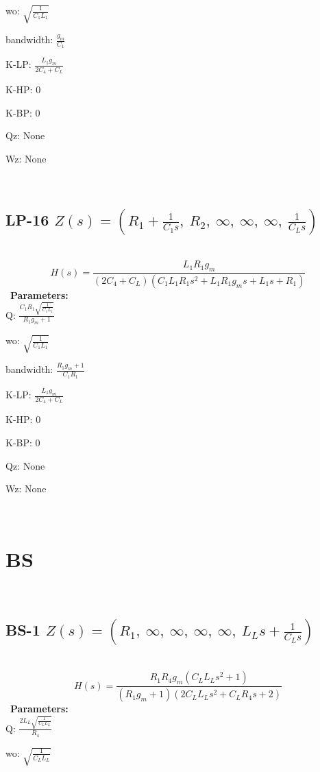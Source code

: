 \documentclass{article}
\begin{document}
wo: $\sqrt{\frac{1}{C_{1} L_{1}}}$\ 

bandwidth: $\frac{g_{m}}{C_{1}}$\ 

K-LP: $\frac{L_{1} g_{m}}{2 C_{4} + C_{L}}$\ 

K-HP: $0$\ 

K-BP: $0$\ 

Qz: $\text{None}$\ 

Wz: $\text{None}$\ 

\ 

\subsection{LP-16 $Z(s) = \left( R_{1} + \frac{1}{C_{1} s}, \  R_{2}, \  \infty, \  \infty, \  \infty, \  \frac{1}{C_{L} s}\right)$ } \ 
\textbf{\[H(s) = \frac{L_{1} R_{1} g_{m}}{\left(2 C_{4} + C_{L}\right) \left(C_{1} L_{1} R_{1} s^{2} + L_{1} R_{1} g_{m} s + L_{1} s + R_{1}\right)}\] } \ 
\textbf{Parameters:}\\ 

Q: $\frac{C_{1} R_{1} \sqrt{\frac{1}{C_{1} L_{1}}}}{R_{1} g_{m} + 1}$\ 

wo: $\sqrt{\frac{1}{C_{1} L_{1}}}$\ 

bandwidth: $\frac{R_{1} g_{m} + 1}{C_{1} R_{1}}$\ 

K-LP: $\frac{L_{1} g_{m}}{2 C_{4} + C_{L}}$\ 

K-HP: $0$\ 

K-BP: $0$\ 

Qz: $\text{None}$\ 

Wz: $\text{None}$\ 

\ 

\section{BS}\ 
\subsection{BS-1 $Z(s) = \left( R_{1}, \  \infty, \  \infty, \  \infty, \  \infty, \  L_{L} s + \frac{1}{C_{L} s}\right)$ } \ 
\textbf{\[H(s) = \frac{R_{1} R_{4} g_{m} \left(C_{L} L_{L} s^{2} + 1\right)}{\left(R_{1} g_{m} + 1\right) \left(2 C_{L} L_{L} s^{2} + C_{L} R_{4} s + 2\right)}\] } \ 
\textbf{Parameters:}\\ 

Q: $\frac{2 L_{L} \sqrt{\frac{1}{C_{L} L_{L}}}}{R_{4}}$\ 

wo: $\sqrt{\frac{1}{C_{L} L_{L}}}$\ 
\end{document}
